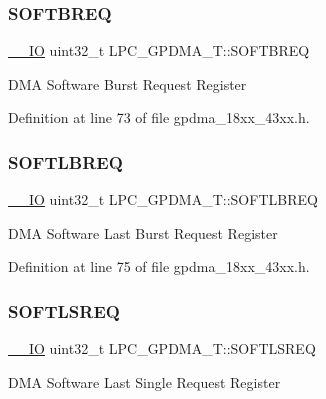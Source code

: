 \subsubsection{\texorpdfstring{S\+O\+F\+T\+B\+R\+EQ}{SOFTBREQ}}
{\footnotesize\ttfamily \hyperlink{core__sc300_8h_aec43007d9998a0a0e01faede4133d6be}{\+\_\+\+\_\+\+IO} uint32\+\_\+t L\+P\+C\+\_\+\+G\+P\+D\+M\+A\+\_\+\+T\+::\+S\+O\+F\+T\+B\+R\+EQ}

D\+MA Software Burst Request Register 

Definition at line 73 of file gpdma\+\_\+18xx\+\_\+43xx.\+h.

\mbox{\label{struct_l_p_c___g_p_d_m_a___t_a565d4d2985feee1cf21acee1185373a5}} 
\subsubsection{\texorpdfstring{S\+O\+F\+T\+L\+B\+R\+EQ}{SOFTLBREQ}}
{\footnotesize\ttfamily \hyperlink{core__sc300_8h_aec43007d9998a0a0e01faede4133d6be}{\+\_\+\+\_\+\+IO} uint32\+\_\+t L\+P\+C\+\_\+\+G\+P\+D\+M\+A\+\_\+\+T\+::\+S\+O\+F\+T\+L\+B\+R\+EQ}

D\+MA Software Last Burst Request Register 

Definition at line 75 of file gpdma\+\_\+18xx\+\_\+43xx.\+h.

\mbox{\label{struct_l_p_c___g_p_d_m_a___t_a0b7a85e9f40e19d368c8358ca48778de}} 
\subsubsection{\texorpdfstring{S\+O\+F\+T\+L\+S\+R\+EQ}{SOFTLSREQ}}
{\footnotesize\ttfamily \hyperlink{core__sc300_8h_aec43007d9998a0a0e01faede4133d6be}{\+\_\+\+\_\+\+IO} uint32\+\_\+t L\+P\+C\+\_\+\+G\+P\+D\+M\+A\+\_\+\+T\+::\+S\+O\+F\+T\+L\+S\+R\+EQ}

D\+MA Software Last Single Request Register 

